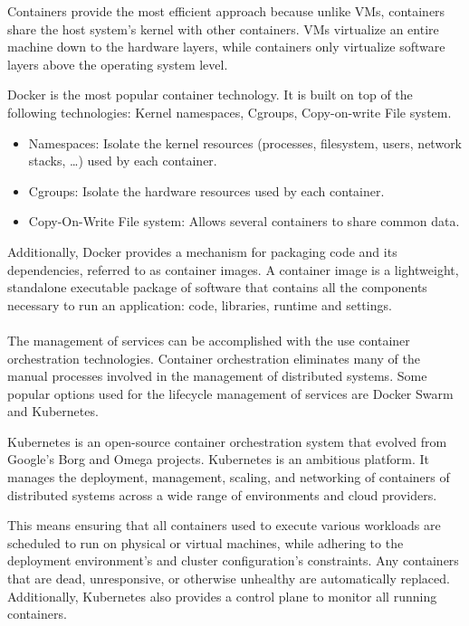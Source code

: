 Containers provide the most efficient approach because unlike VMs, containers share the host system’s kernel with other containers.
VMs virtualize an entire machine down to the hardware layers, while containers only virtualize software layers above the operating system level.

Docker is the most popular container technology. It is built on top of the following technologies: Kernel namespaces, Cgroups, Copy-on-write File system.
\begin{itemize}
    \item Namespaces: Isolate the kernel resources (processes, filesystem, users, network stacks, \ldots) used by each container.
    \item Cgroups: Isolate the hardware resources used by each container.
    \item Copy-On-Write File system: Allows several containers to share common data.
\end{itemize}

Additionally, Docker provides a mechanism for packaging code and its dependencies, referred to as container images.
A container image is a lightweight, standalone executable package of software that contains all the components necessary to run an application: code, libraries, runtime and settings.

\paragraph{}

The management of services can be accomplished with the use container orchestration technologies.
Container orchestration eliminates many of the manual processes involved in the management of distributed systems.
Some popular options used for the lifecycle management of services are Docker Swarm and Kubernetes.

Kubernetes is an open-source container orchestration system that evolved from Google's Borg and Omega projects.
Kubernetes is an ambitious platform. It manages the deployment, management, scaling, and networking of containers of distributed systems across a wide range of environments
and cloud providers.

This means ensuring that all containers used to execute various workloads are scheduled to run on physical or virtual machines,
while adhering to the deployment environment's and cluster configuration's constraints.
Any containers that are dead, unresponsive, or otherwise unhealthy are automatically replaced.
Additionally, Kubernetes also provides a control plane to monitor all running containers.

